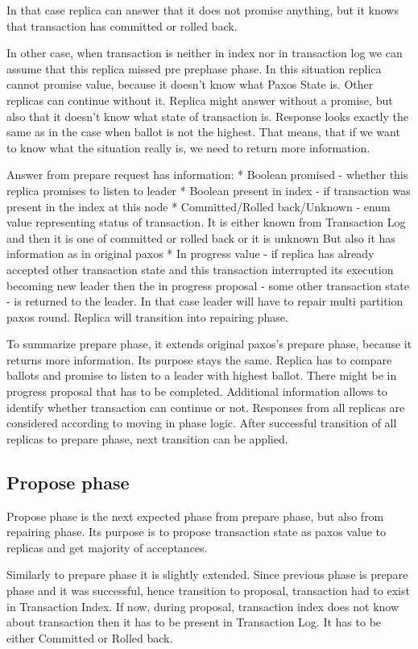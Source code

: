 In that case replica can answer that it does not promise anything, but it knows that transaction has committed or rolled back.


In other case, when transaction is neither in index nor in transaction log we can assume that this replica missed pre prephase phase. In this situation replica cannot promise value, because it doesn’t know what Paxos State is. Other replicas can continue without it. Replica might answer without a promise, but also that it doesn’t know what state of transaction is. Response looks exactly the same as in the case when ballot is not the highest. That means, that if we want to know what the situation really is, we need to return more information.


Answer from prepare request has information:
* Boolean promised - whether this replica promises to listen to leader
* Boolean present in index - if transaction was present in the index at this node
* Committed/Rolled back/Unknown - enum value representing status of transaction. It is either known from Transaction Log and then it is one of committed or rolled back or it is unknown
But also it has information as in original paxos
* In progress value - if replica has already accepted other transaction state and this transaction interrupted its execution becoming new leader then the in progress proposal - some other transaction state - is returned to the leader. In that case leader will have to repair multi partition paxos round. Replica will transition into repairing phase.


To summarize prepare phase, it extends original paxos’s prepare phase, because it returns more information. Its purpose stays the same. Replica has to compare ballots and promise to listen to a leader with highest ballot. There might be in progress proposal that has to be completed. Additional information allows to identify whether transaction can continue or not. Responses from all replicas are considered according to moving in phase logic.
After successful transition of all replicas to prepare phase, next transition can be applied.


\subsection{Propose phase}
Propose phase is the next expected phase from prepare phase, but also from repairing phase. Its purpose is to propose transaction state as paxos value to replicas and get majority of acceptances. 


Similarly to prepare phase it is slightly extended. Since previous phase is prepare phase and it was successful, hence transition to proposal, transaction had to exist in Transaction Index. If now, during proposal,  transaction index does not know about transaction then it has to be present in Transaction Log. It has to be either Committed or Rolled back. 


